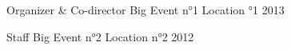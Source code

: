 


\begin{cvhonors}


\cvhonor
{Organizer \& Co-director} %
{Big Event n°1} %
{Location °1} %
{2013} %
    

\cvhonor
{Staff} %
{Big Event n°2} %
{Location n°2} %
{2012} %


\end{cvhonors}